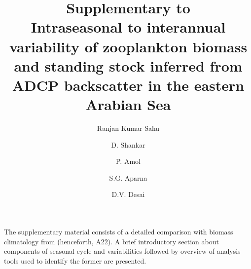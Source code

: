 \documentclass[authoryear,review,12pt]{elsarticle}
\begin{document}
	\begin{frontmatter}
		\title{\textbf{\small Supplementary to} \\ Intraseasonal to interannual variability of zooplankton biomass and standing   stock inferred from ADCP backscatter in the eastern Arabian Sea}
		
		\address[inst1]{organization={CSIR-National Institute of Oceanography}, 
			addressline={Dona Paula},
			postcode={403004},
			state={Goa},
			country={India}}
		
		\address[inst2]{organization={Academy of Scientific and Innovative Research (AcSIR)}, 
			addressline={Ghaziabad},
			postcode={201002},
			state={Uttar Pradesh},
			country={India}}
		
		\address[inst3]{organization={CSIR-NIO, Regional Centre}, 
			addressline={Visakhapatnam},
			postcode={530017},
			state={Andhra Pradesh},
			country={India}}
		
		
		\author[inst1,inst2]{Ranjan Kumar Sahu}
		\author[inst1,inst2]{D. Shankar}
		\author[inst2,inst3]{P. Amol}
		\author[inst1,inst2]{S.G. Aparna}
		\author[inst1,inst2]{D.V. Desai}

	\end{frontmatter}
	\linenumbers
	The supplementary material consists of a detailed comparison with biomass climatology from \citep{aparna2022seasonal} (henceforth, A22). A brief introductory section about components of seasonal cycle and variabilities followed by overview of analysis tools used to identify the former are presented.
	
\end{document}
